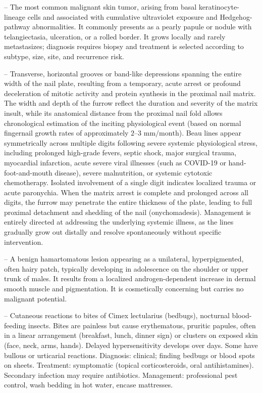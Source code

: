 -- The most common malignant skin tumor, arising from basal keratinocyte-lineage cells and associated with cumulative ultraviolet exposure and Hedgehog-pathway abnormalities. It commonly presents as a pearly papule or nodule with telangiectasia, ulceration, or a rolled border. It grows locally and rarely metastasizes; diagnosis requires biopsy and treatment is selected according to subtype, size, site, and recurrence risk.

-- Transverse, horizontal grooves or band-like depressions spanning the entire width of the nail plate, resulting from a temporary, acute arrest or profound deceleration of mitotic activity and protein synthesis in the proximal nail matrix. The width and depth of the furrow reflect the duration and severity of the matrix insult, while its anatomical distance from the proximal nail fold allows chronological estimation of the inciting physiological event (based on normal fingernail growth rates of approximately $2\text{--}3\text{ mm/month}$). Beau lines appear symmetrically across multiple digits following severe systemic physiological stress, including prolonged high-grade fevers, septic shock, major surgical trauma, myocardial infarction, acute severe viral illnesses (such as COVID-19 or hand-foot-and-mouth disease), severe malnutrition, or systemic cytotoxic chemotherapy. Isolated involvement of a single digit indicates localized trauma or acute paronychia. When the matrix arrest is complete and prolonged across all digits, the furrow may penetrate the entire thickness of the plate, leading to full proximal detachment and shedding of the nail (onychomadesis). Management is entirely directed at addressing the underlying systemic illness, as the lines gradually grow out distally and resolve spontaneously without specific intervention.

-- A benign hamartomatous lesion appearing as a unilateral, hyperpigmented, often hairy patch, typically developing in adolescence on the shoulder or upper trunk of males. It results from a localized androgen-dependent increase in dermal smooth muscle and pigmentation. It is cosmetically concerning but carries no malignant potential.

-- Cutaneous reactions to bites of Cimex lectularius (bedbugs), nocturnal blood-feeding insects. Bites are painless but cause erythematous, pruritic papules, often in a linear arrangement (breakfast, lunch, dinner sign) or clusters on exposed skin (face, neck, arms, hands). Delayed hypersensitivity develops over days. Some have bullous or urticarial reactions. Diagnosis: clinical; finding bedbugs or blood spots on sheets. Treatment: symptomatic (topical corticosteroids, oral antihistamines). Secondary infection may require antibiotics. Management: professional pest control, wash bedding in hot water, encase mattresses.

